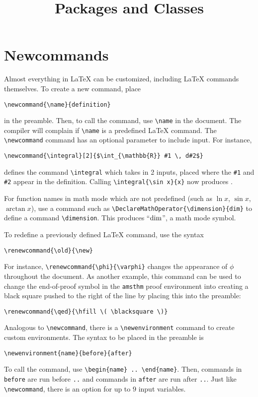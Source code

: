 \documentclass[11pt]{paper}
\title{Packages and Classes}
\date{}
\begin{document}
\maketitle

\section{Newcommands}

Almost everything in \LaTeX{} can be customized, including \LaTeX{} commands
themselves.  To create a new command, place
\begin{lstlisting}
\newcommand{\name}{definition}
\end{lstlisting}
in the preamble.  Then, to call the command, use \verb~\name~ in the document.
The compiler will complain if \verb~\name~ is a predefined \LaTeX{} command.
The \verb~\newcommand~ command has an optional parameter to include input.  For
instance,
\begin{lstlisting}
\newcommand{\integral}[2]{$\int_{\mathbb{R}} #1 \, d#2$}
\end{lstlisting}
defines the command \verb~\integral~ which takes in 2 inputs, placed where the
\verb~#1~ and \verb~#2~ appear in the definition.  Calling
\verb~\integral{\sin x}{x}~ now produces .

For function names in math mode which are not predefined (such as $\ln x$,
$\sin x$, $\arctan x$), use a command such as
\verb~\DeclareMathOperator{\dimension}{dim}~ to define a command
\verb~\dimension~.  This produces ``$\dimension$'', a math mode symbol.

To redefine a previously defined \LaTeX{} command, use the syntax
\begin{verbatim}
\renewcommand{\old}{\new}
\end{verbatim}
For instance, \verb~\renewcommand{\phi}{\varphi}~ changes the appearance of
$\phi$ throughout the document.  As another example, this command can be used to
change the end-of-proof symbol in the \verb~amsthm~ proof environment into
creating a black square pushed to the right of the line by placing this into
the preamble:
\begin{lstlisting}
\renewcommand{\qed}{\hfill \( \blacksquare \)}
\end{lstlisting}

Analogous to \verb~\newcommand~, there is a \verb~\newenvironment~ command to
create custom environments.  The syntax to be placed in the preamble is
\begin{lstlisting}
\newenvironment{name}{before}{after}
\end{lstlisting}
To call the command, use \verb~\begin{name} .. \end{name}~.  Then, commands in
\verb~before~ are run before \verb~..~ and commands in \verb~after~ are run
after \verb~..~.  Just like \verb~\newcommand~, there is an option for up to
$9$ input variables.
\end{document}
